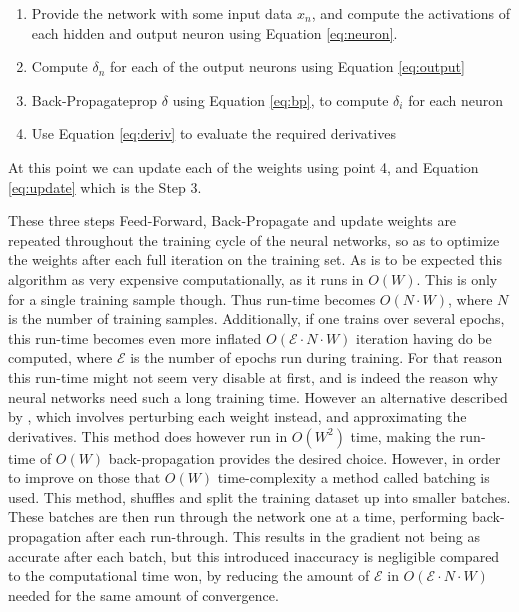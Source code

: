 \begin{enumerate}
    \item

        Provide the network with some input data $x_n$, and compute the
        activations of each hidden and output neuron using Equation
        \eqref{eq:neuron}.

    \item

        Compute $\delta_n$ for each of the output neurons using Equation
        \eqref{eq:output}

    \item

        Back-Propagateprop $\delta$ using Equation \eqref{eq:bp}, to compute
        $\delta_i$ for each neuron

    \item

        Use Equation \eqref{eq:deriv} to evaluate the required derivatives

\end{enumerate}

At this point we can update each of the weights using point 4, and Equation
\eqref{eq:update} which is the Step 3.

These three steps Feed-Forward, Back-Propagate and update weights are repeated
throughout the training cycle of the neural networks, so as to optimize the
weights after each full iteration on the training set. As is to be expected
this algorithm as very expensive computationally, as it runs in $O(W)$. This is
only for a single training sample though. Thus run-time becomes $O(N\cdot W)$,
where $N$ is the number of training samples. Additionally, if one trains over
several epochs, this run-time becomes even more inflated $O(\mathcal{E}\cdot
N\cdot W)$ iteration having do be computed, where $\mathcal{E}$ is the number
of epochs run during training. For that reason this run-time might not seem
very disable at first, and is indeed the reason why neural networks need such
a long training time. However an alternative described by \cite{Bishop}, which
involves perturbing each weight instead, and approximating the derivatives.
This method does however run in $O(W^2)$ time, making the run-time of $O(W)$
back-propagation provides the desired choice. However, in order to improve
on those that $O(W)$ time-complexity a method called batching is used. This
method, shuffles and split the training dataset up into smaller batches.
These batches are then run through the network one at a time, performing
back-propagation after each run-through. This results in the gradient not
being as accurate after each batch, but this introduced inaccuracy is
negligible compared to the computational time won, by reducing the amount of
$\mathcal{E}$ in $O(\mathcal{E}\cdot N\cdot W)$ needed for the same amount of
convergence.\cite{Bishop}


